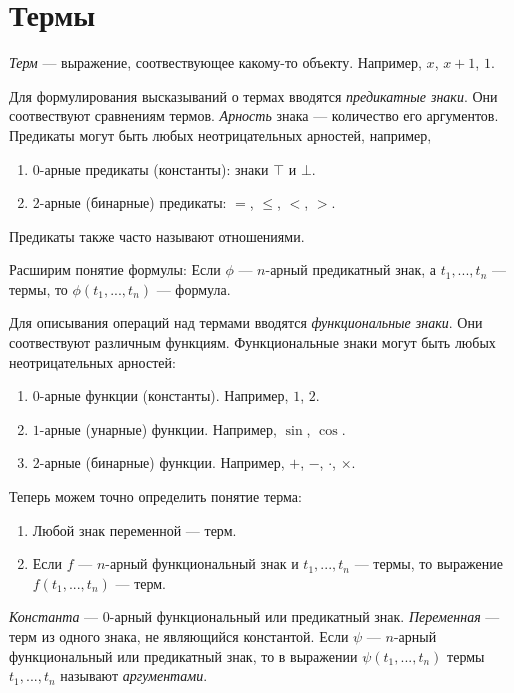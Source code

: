 \pagebreak

\section{Термы}

{\it Терм} --- выражение, соотвествующее какому-то объекту.
Например, $x$, $x+1$, $1$.

Для формулирования высказываний о термах вводятся {\it предикатные знаки}.
Они соотвествуют сравнениям термов.
{\it Арность} знака --- количество его аргументов.
Предикаты могут быть любых неотрицательных арностей, например,
\begin{enumerate}
	\item{}$0$-арные предикаты (константы): знаки $\top$ и $\bot$.
	\item{}$2$-арные (бинарные) предикаты: $=$, $\leq$, $<$, $>$.
\end{enumerate}
Предикаты также часто называют отношениями.

Расширим понятие формулы: Если $\phi$ --- $n$-арный предикатный знак,
а $t_1,...,t_{n}$ --- термы, то $\phi(t_1,...,t_{n})$ --- формула.

Для описывания операций над термами вводятся {\it функциональные знаки}.
Они соотвествуют различным функциям. Функциональные знаки могут быть любых
неотрицательных арностей:
\begin{enumerate}
	\item{}$0$-арные функции (константы). Например, $1$, $2$.
	\item{}$1$-арные (унарные) функции. Например, $\sin$, $\cos$.
	\item{}$2$-арные (бинарные) функции. Например, $+$, $-$, $\cdot$, $\times$.
\end{enumerate}

Теперь можем точно определить понятие терма:
\begin{enumerate}
	\item{}Любой знак переменной --- терм.

	\item{}Если $f$ --- $n$-арный функциональный знак и $t_1,...,t_{n}$ --- термы,
		то выражение $f(t_1,...,t_{n})$ --- терм.
\end{enumerate}

{\it Константа} --- $0$-арный функциональный или предикатный знак.
{\it Переменная} --- терм из одного знака,
не являющийся константой.
Если $\psi$ --- $n$-арный функциональный или предикатный знак, то в выражении
$\psi(t_1,...,t_{n})$ термы $t_1,...,t_{n}$ называют {\it аргументами}.

